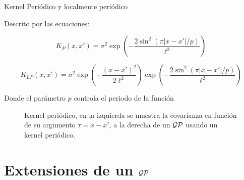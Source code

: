 \documentclass[9pt]{beamer}
\begin{document}
\begin{frame}{Kernel Periódico y localmente periódico}
    
    Descrito por las ecuaciones:

    \begin{equation*}
        K_{P}(x, x') = \sigma^2 \exp\left(-\frac{2\sin^2\left(\pi |x- x'| / p \right)}{\ell^2 } \right)
    \end{equation*}
    
    \begin{equation*}
        K_{LP}(x, x') = \sigma^2  \exp\left(-\frac{\left(x- x' \right)^2}{2\ell^2 } \right) \exp\left(-\frac{2\sin^2\left(\pi |x- x'| / p \right)}{\ell^2 } \right)
    \end{equation*}

    Donde el parámetro $p$ controla el periodo de la función \pause

    \begin{figure}[H]
        \centering
        \caption{Kernel periódico, en la izquierda se muestra la covarianza en función de su argumento $\tau=x-x'$, a la derecha de un $\mathcal{GP}$ usando un kernel periódico.}
    \end{figure}
 

    
\end{frame}

\section{Extensiones de un $\mathcal{GP}$}
\end{document}
